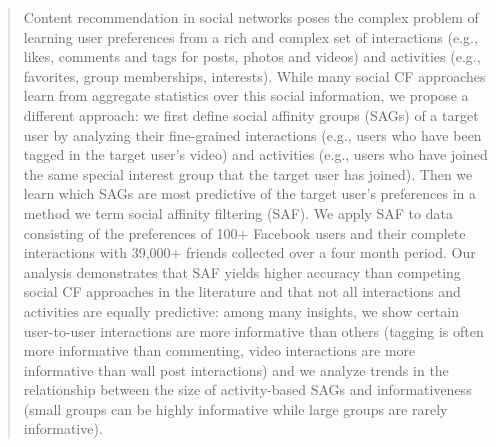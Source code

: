 \begin{quote}
Content recommendation in social networks poses the complex problem of
learning user preferences from a rich and complex set of interactions
(e.g., likes, comments and tags for posts, photos and videos) and
activities (e.g., favorites, group memberships, interests).  While
many social CF approaches learn from aggregate statistics over this
social information, we propose a different approach: we first define
social affinity groups (SAGs) of a target user by analyzing their
fine-grained interactions (e.g., users who have been tagged in the
target user's video) and activities (e.g., users who have joined the
same special interest group that the target user has joined).  Then we
learn which SAGs are most predictive of the target user's preferences
in a method we term social affinity filtering (SAF).  We apply SAF to
data consisting of the preferences of 100+ Facebook users and their
complete interactions with 39,000+ friends collected over a four month
period.  Our analysis demonstrates that SAF yields higher accuracy
than competing social CF approaches in the literature and that not all
interactions and activities are equally predictive: among many
insights, we show certain user-to-user interactions are more
informative than others (tagging is often more informative than
commenting, video interactions are more informative than wall post
interactions) and we analyze trends in the relationship between the
size of activity-based SAGs and informativeness (small groups can be
highly informative while large groups are rarely informative).
\end{quote}
